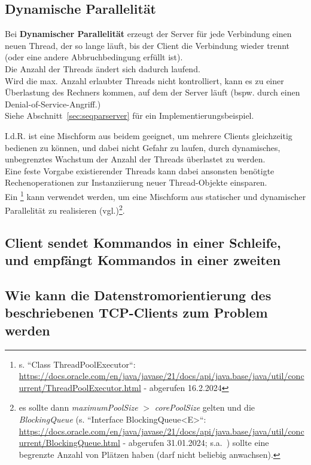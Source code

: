 \subsection*{Dynamische Parallelität}

Bei \textbf{Dynamischer Parallelität} erzeugt der Server für jede Verbindung einen neuen Thread, der so lange läuft, bis der Client die Verbindung wieder trennt (oder eine andere Abbruchbedingung erfüllt ist).\\
Die Anzahl der Threads ändert sich dadurch laufend.\\
Wird die max. Anzahl erlaubter Threads nicht kontrolliert, kann es zu einer Überlastung des Rechners kommen, auf dem der Server läuft (bspw. durch einen Denial-of-Service-Angriff.)\\
Siehe Abschnitt~\ref{sec:seqparserver} für ein Implementierungsbeispiel.

\noindent
I.d.R. ist eine Mischform aus beidem geeignet, um mehrere Clients gleichzeitig bedienen zu können, und dabei nicht Gefahr zu laufen, durch dynamisches, unbegrenztes Wachstum der Anzahl der Threads überlastet zu werden.\\
Eine feste Vorgabe existierender Threads kann dabei ansonsten benötigte Rechenoperationen zur Instanziierung neuer Thread-Objekte
einsparen.\\
Ein \footnote{
    s. ``Class ThreadPoolExecutor``: \url{https://docs.oracle.com/en/java/javase/21/docs/api/java.base/java/util/concurrent/ThreadPoolExecutor.html} - abgerufen 16.2.2024
} kann verwendet werden, um eine Mischform aus statischer und dynamischer Parallelität zu realisieren (vgl.\cite[164 u. 302]{Oec22})\footnote{
    es sollte dann \textit{maximumPoolSize} $>$ \textit{corePoolSize} gelten und die \textit{BlockingQueue} (s. ``Interface BlockingQueue<E>``: \url{https://docs.oracle.com/en/java/javase/21/docs/api/java.base/java/util/concurrent/BlockingQueue.html} - abgerufen 31.01.2024; s.a.~\cite[146]{Oec22}) sollte eine begrenzte Anzahl von Plätzen haben (darf nicht beliebig anwachsen).
}.

\subsection*{Client sendet Kommandos in einer Schleife, und empfängt Kommandos in einer zweiten}

\subsection*{Wie kann die Datenstromorientierung des beschriebenen TCP-Clients zum Problem werden}

